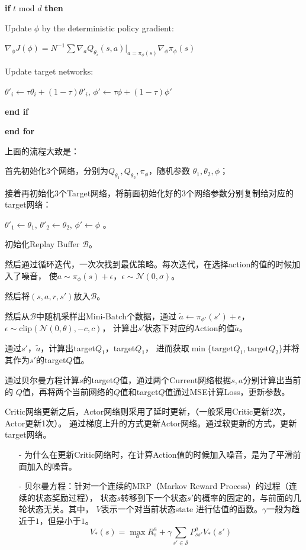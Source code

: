 	\setlength\parindent{4em}
	{\bf if} $t$ mod $d$ {\bf then}
		
		\setlength\parindent{6em}
		Update $\phi$ by the deterministic policy gradient: 

		\setlength\parindent{7em}
		$
		\nabla_\phi J(\phi) = N^{-1}\sum\nabla_a Q_{\theta_i}(s,a)|_{a=\pi_\phi(s)}
		\nabla_\phi\pi_\phi(s)
		$

		\setlength\parindent{6em}
		Update target networks: 

		\setlength\parindent{7em}
		$
		\theta'_i\leftarrow\tau\theta_i + (1-\tau)\theta'_i
		$,
		$
		\phi'\leftarrow\tau\phi + (1-\tau)\phi'
		$

	\setlength\parindent{4em}
	{\bf end if}

\setlength\parindent{2em}
{\bf end for}

上面的流程大致是：

首先初始化3个网络，分别为$Q_{\theta_1}, Q_{\theta_2}, \pi_\phi$，随机参数
$\theta_1, \theta_2, \phi$；

接着再初始化3个Target网络，将前面初始化好的3个网络参数分别复制给对应的target网络：

\setlength\parindent{3em}
$\theta'_1 \leftarrow \theta_1$, 
$\theta'_2 \leftarrow \theta_2$, 
$\phi' \leftarrow \phi$ 。

\setlength\parindent{2em}
初始化Replay Buffer $\mathcal{B}$。

然后通过循环迭代，一次次找到最优策略。每次迭代，在选择action的值的时候加入了噪音，
使$a\sim\pi_\phi(s) + \epsilon$，$\epsilon\sim\mathcal{N}(0, \sigma)$。

然后将$(s,a,r,s')$放入$\mathcal{B}$。

然后从$\mathcal{B}$中随机采样出Mini-Batch个数据，通过
$\tilde{a} \leftarrow \pi_{\phi'}(s') + \epsilon$，
$\epsilon\sim\text{clip}(\mathcal{N}(0,\theta), -c, c)$，
计算出$s'$状态下对应的Action的值$\tilde{a}$。

通过$s'$，$\tilde{a}$，计算出target$Q_1$，target$Q_1$，
进而获取$\min\{\text{target}Q_1, \text{target}Q_2\}$并将其作为$s'$的target$Q$值。

通过贝尔曼方程计算$s$的target$Q$值，通过两个Current网络根据$s,a$分别计算出当前的
$Q$值，再将两个当前网络的$Q$值和target$Q$值通过MSE计算Loss，更新参数。

Critic网络更新之后，Actor网络则采用了延时更新，（一般采用Critic更新2次，Actor更新1次）。
通过梯度上升的方式更新Actor网络。通过软更新的方式，更新target网络。

\begin{itemize}
\item[-]
为什么在更新Critic网络时，在计算Action值的时候加入噪音，是为了平滑前面加入的噪音。

\item[-]
贝尔曼方程：针对一个连续的MRP（Markov Reward Process）的过程（连续的状态奖励过程），
状态$s$转移到下一个状态$s'$的概率的固定的，与前面的几轮状态无关。其中，
$V$表示一个对当前状态state 进行估值的函数。$\gamma$一般为趋近于$1$，但是小于$1$。
$$
V_*(s) = \max_a R^a_s + \gamma \sum_{s'\in \mathcal{S}}P^a_{ss'}V_*(s')
$$

\end{itemize}



